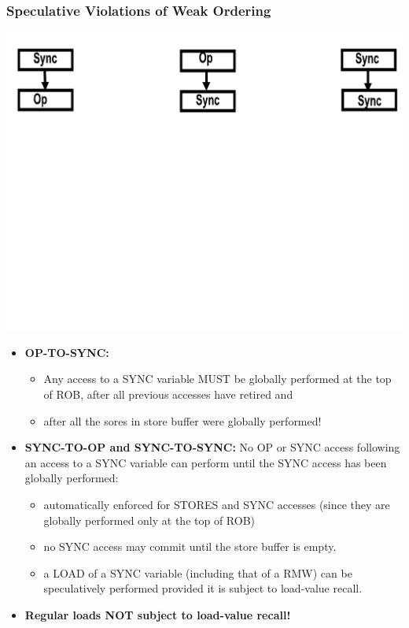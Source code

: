 \documentclass{beamer}
\newcommand{\emphh}[1]{\textcolor{CosGreen}{ #1}}
\begin{document}
\begin{frame}[fragile,t]
\frametitle{Speculative Violations of Weak Ordering}

\includegraphics[width=59ex]{Ch7Figs/WeakOrdering.pdf}
\vspace{-33ex}

\begin{itemize}
\item \emphh{\bf OP-TO-SYNC:}
    \begin{itemize}
        \item Any access to a SYNC variable MUST be globally performed
                at the top of ROB, after all previous accesses have retired and
        \item after all the sores in store buffer were globally performed!
    \end{itemize}\medskip


\item \emphh{\bf SYNC-TO-OP and SYNC-TO-SYNC:} No OP or SYNC access 
                following an access to a SYNC variable
                can perform until the SYNC access has been globally performed:
    \begin{itemize}
        \item automatically enforced for STORES and SYNC accesses
                (since they are globally performed only at the top of ROB)
        \item no SYNC access may commit until the store buffer
                is empty.
        \item a LOAD of a SYNC variable (including that of a RMW)
                can be speculatively performed provided it is subject
                to load-value recall.
    \end{itemize}\medskip

\item \emphh{\bf Regular loads NOT subject to load-value recall!}
\end{itemize}

\end{frame}
\end{document}
